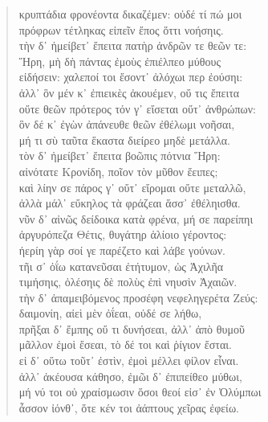\begin{Spacing}{1.5}
\begin{verse}
{\large\g κρυπτάδια φρονέοντα δικαζέμεν: οὐδέ τί πώ μοι  } \\
{\large\g πρόφρων τέτληκας εἰπεῖν ἔπος ὅττι νοήσηις.  } \\
{\large\g τὴν δ᾽ ἠμείβετ᾽ ἔπειτα πατὴρ ἀνδρῶν τε θεῶν τε:  } \\
{\large\g Ἥρη, μὴ δὴ πάντας ἐμοὺς ἐπιέλπεο μύθους  } \\
{\large\g εἰδήσειν: χαλεποί τοι ἔσοντ᾽ ἀλόχωι περ ἐούσηι:  } \\
{\large\g ἀλλ᾽ ὃν μέν κ᾽ ἐπιεικὲς ἀκουέμεν, οὔ τις ἔπειτα  } \\
{\large\g οὔτε θεῶν πρότερος τόν γ᾽ εἴσεται οὔτ᾽ ἀνθρώπων:  } \\
{\large\g ὃν δέ κ᾽ ἐγὼν ἀπάνευθε θεῶν ἐθέλωμι νοῆσαι,  } \\
{\large\g μή τι σὺ ταῦτα ἕκαστα διείρεο μηδὲ μετάλλα.  } \\
{\large\g τὸν δ᾽ ἠμείβετ᾽ ἔπειτα βοῶπις πότνια Ἥρη:  } \\
{\large\g αἰνότατε Κρονίδη, ποῖον τὸν μῦθον ἔειπες;  } \\
{\large\g καὶ λίην σε πάρος γ᾽ οὔτ᾽ εἴρομαι οὔτε μεταλλῶ,  } \\
{\large\g ἀλλὰ μάλ᾽ εὔκηλος τὰ φράζεαι ἅσσ᾽ ἐθέληισθα.  } \\
{\large\g νῦν δ᾽ αἰνῶς δείδοικα κατὰ φρένα, μή σε παρείπηι  } \\
{\large\g ἀργυρόπεζα Θέτις, θυγάτηρ ἁλίοιο γέροντος:  } \\
{\large\g ἠερίη γὰρ σοί γε παρέζετο καὶ λάβε γούνων.  } \\
{\large\g τῆι σ᾽ ὀΐω κατανεῦσαι ἐτήτυμον, ὡς Ἀχιλῆα  } \\
{\large\g τιμήσηις, ὀλέσηις δὲ πολὺς ἐπὶ νηυσὶν Ἀχαιῶν.  } \\
{\large\g τὴν δ᾽ ἀπαμειβόμενος προσέφη νεφεληγερέτα Ζεύς:  } \\
{\large\g δαιμονίη, αἰεὶ μὲν ὀΐεαι, οὐδέ σε λήθω,  } \\
{\large\g πρῆξαι δ᾽ ἔμπης οὔ τι δυνήσεαι, ἀλλ᾽ ἀπὸ θυμοῦ  } \\
{\large\g μᾶλλον ἐμοὶ ἔσεαι, τὸ δέ τοι καὶ ῥίγιον ἔσται.  } \\
{\large\g εἰ δ᾽ οὕτω τοῦτ᾽ ἐστὶν, ἐμοὶ μέλλει φίλον εἶναι.  } \\
{\large\g ἀλλ᾽ ἀκέουσα κάθησο, ἐμῶι δ᾽ ἐπιπείθεο μύθωι,  } \\
{\large\g μή νύ τοι οὐ χραίσμωσιν ὅσοι θεοί εἰσ᾽ ἐν Ὀλύμπωι  } \\
{\large\g ἆσσον ἰόνθ᾽, ὅτε κέν τοι ἀάπτους χεῖρας ἐφείω.  } \\

\end{verse}
\end{Spacing}
